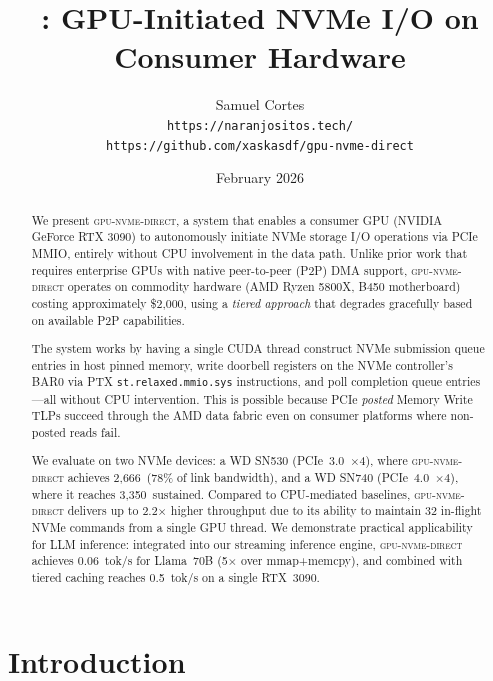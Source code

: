 \documentclass{article}
\title{\sysname{}: GPU-Initiated NVMe I/O on Consumer Hardware}
\author{
  Samuel Cortes \\
  \texttt{https://naranjositos.tech/} \\
  \texttt{https://github.com/xaskasdf/gpu-nvme-direct}
}
\date{February 2026}
\newcommand{\sysname}{\textsc{gpu-nvme-direct}}
\newcommand{\MBs}{\,\text{MB/s}}
\begin{document}
\maketitle

\begin{abstract}

We present \sysname{}, a system that enables a consumer GPU (NVIDIA GeForce RTX
3090) to autonomously initiate NVMe storage I/O operations via PCIe MMIO,
entirely without CPU involvement in the data path. Unlike prior work that
requires enterprise GPUs with native peer-to-peer (P2P) DMA support,
\sysname{} operates on commodity hardware (AMD Ryzen 5800X, B450 motherboard)
costing approximately \$2{,}000, using a \emph{tiered approach} that degrades
gracefully based on available P2P capabilities.

The system works by having a single CUDA thread construct NVMe submission queue
entries in host pinned memory, write doorbell registers on the NVMe
controller's BAR0 via PTX \texttt{st.relaxed.mmio.sys} instructions, and poll
completion queue entries---all without CPU intervention. This is possible
because PCIe \emph{posted} Memory Write TLPs succeed through the AMD data
fabric even on consumer platforms where non-posted reads fail.

We evaluate on two NVMe devices: a WD SN530 (PCIe~3.0~$\times$4), where
\sysname{} achieves 2{,}666\MBs{} (78\% of link bandwidth), and a WD SN740
(PCIe~4.0~$\times$4), where it reaches 3{,}350\MBs{} sustained. Compared to
CPU-mediated baselines, \sysname{} delivers up to 2.2$\times$ higher
throughput due to its ability to maintain 32 in-flight NVMe commands from a
single GPU thread. We demonstrate practical applicability for LLM inference:
integrated into our streaming inference engine, \sysname{} achieves
0.06~tok/s for Llama~70B (5$\times$ over mmap+memcpy), and combined with
tiered caching reaches 0.5~tok/s on a single RTX~3090.

\end{abstract}


\section{Introduction}
\label{sec:intro}
\end{document}
